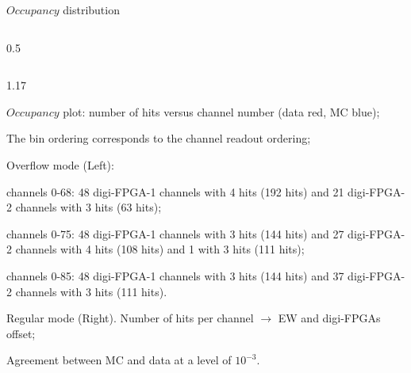 \documentclass{beamer}
\begin{document}
\begin{frame}{$Occupancy$ distribution}
\begin{columns}
\begin{column}{0.5 \framewidth}
\begin{figure}[H]
\end{figure} 
    \end{column}
\end{columns}      
\vspace{-3.mm}
 \begin{columns}
    \begin{column}{1.17\framewidth}
        \setlength{\leftmargini}{1.2em}
     \begin{itemize}
     {\footnotesize
      \item $Occupancy$ plot: number of hits versus channel number (data red, MC blue);
      \item The bin ordering corresponds to the channel readout ordering;
    \item Overflow mode (Left):   }
    \begin{itemize}
    {\footnotesize
        \item channels 0-68: 48 digi-FPGA-1 channels with 4 hits (192 hits) and 21 digi-FPGA-2 channels with 3 hits (63 hits);
        \item channels 0-75: 48 digi-FPGA-1 channels with 3 hits (144 hits) and 27 digi-FPGA-2 channels with 4 hits (108 hits) and 1 with 3 hits (111 hits);
        \item channels 0-85: 48 digi-FPGA-1 channels with 3 hits (144 hits) and 37 digi-FPGA-2 channels with 3 hits (111 hits).}
    \end{itemize}
    {\footnotesize \item  Regular mode (Right). Number of hits per channel $\rightarrow$ EW and digi-FPGAs offset;
        \vspace{-0.5mm}
    \item Agreement between MC and data at a level of $10^{-3}$.
    }
   
        \end{itemize}
             \end{column}
\end{columns}     
\end{frame}
\end{document}
